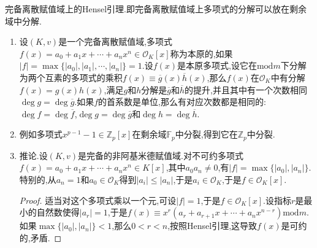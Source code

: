 完备离散赋值域上的Hensel引理.即完备离散赋值域上多项式的分解可以放在剩余域中分解.
\begin{enumerate}
	\item 设$(K,v)$是一个完备离散赋值域,多项式$f(x)=a_0+a_1x+\cdots+a_nx^n\in\mathscr{O}_K[x]$称为本原的,如果$|f|=\max\{|a_0|,|a_1|,\cdots,|a_n|\}=1$.设$f(x)$是本原多项式,设它在$\mathrm{mod}m$下分解为两个互素的多项式的乘积$f(x)\equiv\overline{g}(x)\overline{h}(x)$,那么$f(x)$在$\mathscr{O}_K$中有分解$f(x)=g(x)h(x)$,满足$g$和$h$分解是$\overline{g}$和$\overline{h}$的提升,并且其中有一个次数相同$\deg g=\deg\overline{g}$.如果$f$的首系数是单位,那么有对应次数都是相同的:$\deg f=\deg\overline{f}$,$\deg g=\deg\overline{g}$和$\deg h=\deg\overline{h}$.
	\item 例如多项式$x^{p-1}-1\in\mathbb{Z}_p[x]$在剩余域$\mathbb{F}_p$中分裂,得到它在$\mathbb{Z}_p$中分裂.
	\item 推论.设$(K,v)$是完备的非阿基米德赋值域.对不可约多项式$f(x)=a_0+a_1x+\cdots+a_nx^n\in K[x]$,其中$a_0a_n\not=0$,有$|f|=\max\{|a_0|,|a_n|\}$.特别的,从$a_n=1$和$a_0\in\mathscr{O}_K$得到$|a_i|\le|a_n|$,于是$a_i\in\mathscr{O}_K$,于是$f\in\mathscr{O}_K[x]$.
	\begin{proof}
		
		适当对这个多项式乘以一个元,可设$|f|=1$,于是$f\in\mathscr{O}_K[x]$.设指标$r$是最小的自然数使得$|a_r|=1$,于是$f(x)\equiv x^r(a_r+a_{r+1}x+\cdots+a_nx^{n-r})\mathrm{mod}m$.如果$\max\{|a_0|,|a_n|\}<1$,那么$0<r<n$,按照Hensel引理,这导致$f(x)$是可约的,矛盾.
	\end{proof}
\end{enumerate}

